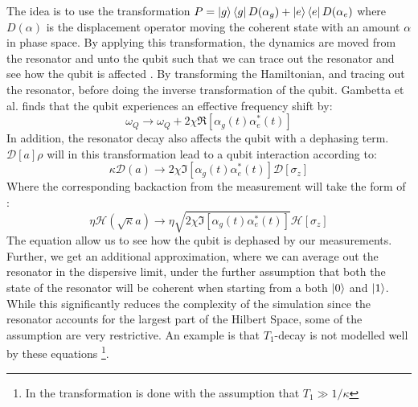 The idea is to use the transformation $P = \ket{g}\bra{g}D(\alpha_g) + \ket{e}\bra{e}D(\alpha_e)$ where $D(\alpha)$ is the displacement operator moving the coherent state with an amount $\alpha$ in phase space. By applying this transformation, the dynamics are moved from the resonator and unto the qubit such that we can trace out the resonator and see how the qubit is affected \cite{gambetta_quantum_2008}. 
By transforming the Hamiltonian, and tracing out the resonator, before doing the inverse transformation of the qubit. Gambetta et al. finds that the qubit experiences an effective frequency shift by:
\begin{equation}
    \omega_Q \to \omega_Q + 2 \chi \Re[\alpha_g(t)\alpha_e^*(t)]
\end{equation}
In addition, the resonator decay also affects the qubit with a dephasing term. $\mathcal{D}[a]\rho$ will in this transformation lead to a qubit interaction according to:
\begin{equation}
    \kappa\mathcal{D}(a) \to 2\chi \Im[\alpha_g(t)\alpha_e^*(t)] \mathcal{D}[\sigma_z]
\end{equation}
Where the corresponding backaction from the measurement will take the form of \cite{campagne-ibarcq_measurement_nodate}:
\begin{equation}
    \eta\mathcal{H}(\sqrt{\kappa} a) \to \eta \sqrt{2 \chi \Im[\alpha_g(t)\alpha_e^*(t)]} \mathcal{H}[\sigma_z]
\end{equation}
The equation allow us to see how the qubit is dephased by our measurements. Further, we get an additional approximation, where we can average out the resonator in the dispersive limit, under the further assumption that both the state of the resonator will be coherent when starting from a both $\ket{0}$ and $\ket{1}$. While this significantly reduces the complexity of the simulation since the resonator accounts for the largest part of the Hilbert Space, some of the assumption are very restrictive. An example is that $T_1$-decay is not modelled well by these equations \footnote{In \cite{gambetta_quantum_2008} the transformation is done with the assumption that $T_1 \gg 1 / \kappa$}. 